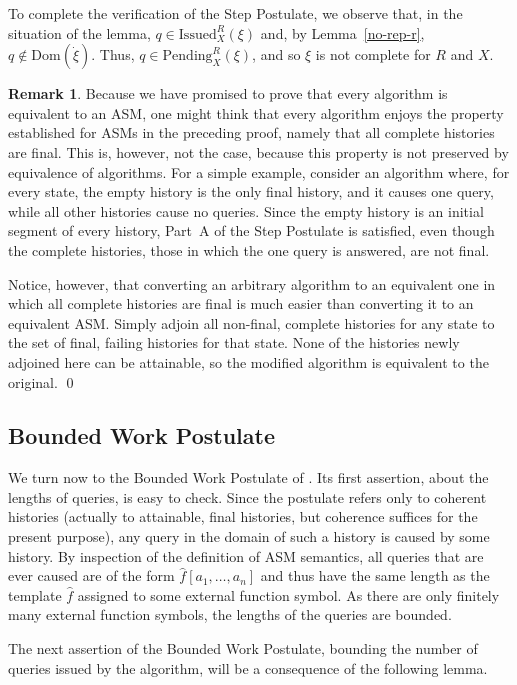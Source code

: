 \documentclass{LMCS}
\theoremstyle{definition}
\newtheorem{rmk}[thm]{Remark}
\newcommand{\Issued}{\text{Issued}}
\newcommand{\ans}{\dot}
\newcommand{\dom}[1]{\ensuremath{{\text{Dom}}(#1)}}
\begin{document}
To complete the verification of the Step Postulate, we observe that,
in the situation of the lemma, $q\in\Issued^R_X(\xi)$ and, by
Lemma~\ref{no-rep-r}, $q\notin\dom{\ans\xi}$.  Thus,
$q\in\text{Pending}^R_X(\xi)$, and so $\xi$ is not complete for $R$
and $X$.

\begin{rmk}
  Because we have promised to prove that every algorithm is equivalent
  to an ASM, one might think that every algorithm enjoys the property
  established for ASMs in the preceding proof, namely that all
  complete histories are final.  This is, however, not the case,
  because this property is not preserved by equivalence of algorithms.
  For a simple example, consider an algorithm where, for every state,
  the empty history is the only final history, and it causes one
  query, while all other histories cause no queries.  Since the empty
  history is an initial segment of every history, Part~A of the Step
  Postulate is satisfied, even though the complete histories, those in
  which the one query is answered, are not final.

Notice, however, that converting an arbitrary algorithm to an
equivalent one in which all complete histories are final is much
easier than converting it to an equivalent ASM.  Simply adjoin all
non-final, complete histories for any state to the set of final,
failing histories for that state.  None of the histories newly
adjoined here can be attainable, so the modified algorithm is
equivalent to the original.  \qed\end{rmk}

\subsection{Bounded Work Postulate}
We turn now to the Bounded Work Postulate of \cite{ga1}.  Its first
assertion, about the lengths of queries, is easy to check.  Since
the postulate refers only to coherent histories (actually to
attainable, final histories, but coherence suffices for the present
purpose), any query in the domain of such a history is caused by
some history.  By inspection of the definition of ASM semantics, all
queries that are ever caused are of the form $\hat f[a_1,\dots,a_n]$
and thus have the same length as the template $\hat f$ assigned to
some external function symbol.  As there are only finitely many
external function symbols, the lengths of the queries are bounded.

The next assertion of the Bounded Work Postulate, bounding the number
of queries issued by the algorithm, will be a consequence of the
following lemma.
\end{document}
